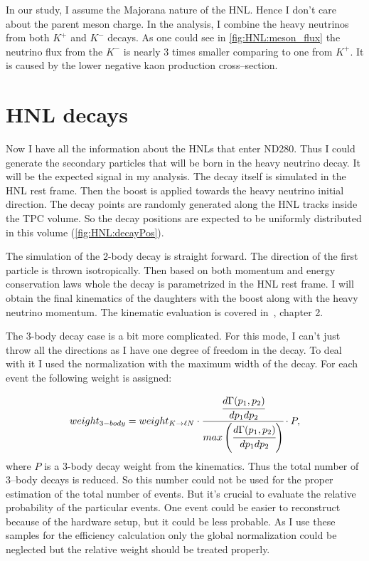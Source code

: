 \documentclass[../main.tex]{subfiles}
\begin{document}
In our study, I assume the Majorana nature of the HNL. Hence I don't care about the parent meson charge. In the analysis, I combine the heavy neutrinos from both $K^+$ and $K^-$ decays. As one could see in \autoref{fig:HNL:meson_flux} the neutrino flux from the $K^-$ is nearly 3 times smaller comparing to one from $K^+$. It is caused by the lower negative kaon production cross--section.

\section{HNL decays}
Now I have all the information about the HNLs that enter ND280. Thus I could generate the secondary particles that will be born in the heavy neutrino decay. It will be the expected signal in my analysis. The decay itself is simulated in the HNL rest frame. Then the boost is applied towards the heavy neutrino initial direction. The decay points are randomly generated along the  HNL tracks inside the TPC volume. So the decay positions are expected to be uniformly distributed in this volume (\autoref{fig:HNL:decayPos}).

The simulation of the 2-body decay is straight forward. The direction of the first particle is thrown isotropically. Then based on both momentum and energy conservation laws whole the decay is parametrized in the HNL rest frame. I will obtain the final kinematics of the daughters with the boost along with the heavy neutrino momentum. The kinematic evaluation is covered in~\cite{Landau2013}, chapter 2.

The 3-body decay case is a bit more complicated. For this mode, I can't just throw all the directions as I have one degree of freedom in the decay. To deal with it I used the normalization with the maximum width of the decay. For each event the following weight is assigned:

\begin{equation}
    weight_{3-body}=weight_{K\rightarrow \ell N}\cdot\cfrac{\cfrac{d\Gamma(p_1,p_2)}{dp_1dp_2}}{max\left(\cfrac{d\Gamma(p_1,p_2)}{dp_1dp_2}\right)}\cdot P,
\end{equation}
where $P$ is a 3-body decay weight from the kinematics. Thus the total number of 3--body decays is reduced. So this number could not be used for the proper estimation of the total number of events. But it's crucial to evaluate the relative probability of the particular events. One event could be easier to reconstruct because of the hardware setup, but it could be less probable. As I use these samples for the efficiency calculation only the global normalization could be neglected but the relative weight should be treated properly.
\end{document}
